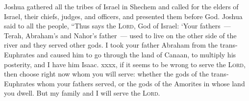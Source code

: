 
\begin{inparaenum}
     Joshua gathered all the tribes of Israel in Shechem and called for the elders of Israel, their chiefs, judges, and officers, and presented them before God.%
     Joshua said to all the people, ``Thus says the \textsc{Lord}, God of Israel: `Your fathers~--- Terah, Abraham's and Nahor's father~--- used to live on the other side of the river and they served other gods.%
     I took your father Abraham from the trans-Euphrates and caused him to go through the land of Canaan, to multiply his posterity, and I have him Isaac.%
     xxxx, if it seems to be wrong to serve the \textsc{Lord}, then choose right now whom you will serve: whether the gods of the trans-Euphrates whom your fathers served, or the gods of the Amorites in whose land you dwell. But my family and I will serve the \textsc{Lord}.%
    
    
    
    
\end{inparaenum}
